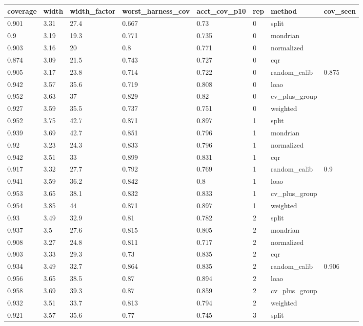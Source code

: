 \begin{tabular}{llllllll}
\toprule
coverage & width & width\_factor & worst\_harness\_cov & acct\_cov\_p10 & rep & method & cov\_seen \\
\midrule
0.901 & 3.31 & 27.4 & 0.667 & 0.73 & 0 & split &  \\
0.9 & 3.19 & 19.3 & 0.771 & 0.735 & 0 & mondrian &  \\
0.903 & 3.16 & 20 & 0.8 & 0.771 & 0 & normalized &  \\
0.874 & 3.09 & 21.5 & 0.743 & 0.727 & 0 & cqr &  \\
0.905 & 3.17 & 23.8 & 0.714 & 0.722 & 0 & random\_calib & 0.875 \\
0.942 & 3.57 & 35.6 & 0.719 & 0.808 & 0 & loao &  \\
0.952 & 3.63 & 37 & 0.829 & 0.82 & 0 & cv\_plus\_group &  \\
0.927 & 3.59 & 35.5 & 0.737 & 0.751 & 0 & weighted &  \\
0.952 & 3.75 & 42.7 & 0.871 & 0.897 & 1 & split &  \\
0.939 & 3.69 & 42.7 & 0.851 & 0.796 & 1 & mondrian &  \\
0.92 & 3.23 & 24.3 & 0.833 & 0.796 & 1 & normalized &  \\
0.942 & 3.51 & 33 & 0.899 & 0.831 & 1 & cqr &  \\
0.917 & 3.32 & 27.7 & 0.792 & 0.769 & 1 & random\_calib & 0.9 \\
0.941 & 3.59 & 36.2 & 0.842 & 0.8 & 1 & loao &  \\
0.953 & 3.65 & 38.1 & 0.832 & 0.833 & 1 & cv\_plus\_group &  \\
0.954 & 3.85 & 44 & 0.871 & 0.897 & 1 & weighted &  \\
0.93 & 3.49 & 32.9 & 0.81 & 0.782 & 2 & split &  \\
0.937 & 3.5 & 27.6 & 0.815 & 0.805 & 2 & mondrian &  \\
0.908 & 3.27 & 24.8 & 0.811 & 0.717 & 2 & normalized &  \\
0.903 & 3.33 & 29.3 & 0.73 & 0.835 & 2 & cqr &  \\
0.934 & 3.49 & 32.7 & 0.864 & 0.835 & 2 & random\_calib & 0.906 \\
0.956 & 3.65 & 38.5 & 0.87 & 0.894 & 2 & loao &  \\
0.958 & 3.69 & 39.3 & 0.87 & 0.859 & 2 & cv\_plus\_group &  \\
0.932 & 3.51 & 33.7 & 0.813 & 0.794 & 2 & weighted &  \\
0.921 & 3.57 & 35.6 & 0.77 & 0.745 & 3 & split &  \\

\end{tabular}

